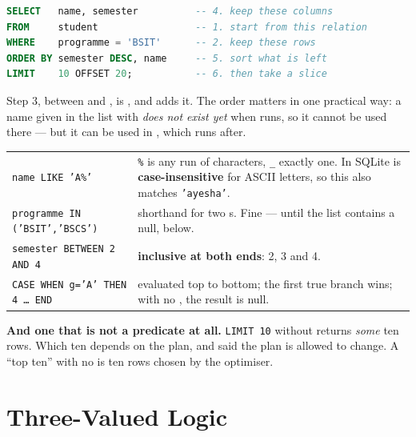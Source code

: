 \begin{definitionbox}
\begin{lstlisting}[language=sql]
SELECT   name, semester          -- 4. keep these columns
FROM     student                 -- 1. start from this relation
WHERE    programme = 'BSIT'      -- 2. keep these rows
ORDER BY semester DESC, name     -- 5. sort what is left
LIMIT    10 OFFSET 20;           -- 6. then take a slice
\end{lstlisting}

\smallskip
Step 3, between  and , is , and
 adds it. The order matters in one practical way: a name given
in the  list with  \emph{does not exist yet} when
 runs, so it cannot be used there --- but it can be used in
, which runs after.
\end{definitionbox}

\begin{examplebox}
\begin{tabular}{@{}L{4.6cm}L{9.4cm}@{}}
\texttt{name LIKE 'A\%'} & \texttt{\%} is any run of characters,
  \texttt{\_} exactly one. In SQLite  is \textbf{case-insensitive}
  for ASCII letters, so this also matches \texttt{'ayesha'}. \\
\texttt{programme IN ('BSIT','BSCS')} & shorthand for two s. Fine
  --- until the list contains a null, below. \\
\texttt{semester BETWEEN 2 AND 4} & \textbf{inclusive at both ends}: 2, 3 and
  4. \\
\texttt{CASE WHEN g='A' THEN 4 \dots\ END} & evaluated top to bottom; the
  first true branch wins; with no , the result is null. \\
\end{tabular}

\smallskip
\textbf{And one that is not a predicate at all.} \texttt{LIMIT 10} without
 returns \emph{some} ten rows. Which ten depends on the plan,
and  said the plan is allowed to change. A ``top ten'' with
no  is ten rows chosen by the optimiser.
\end{examplebox}

\section{Three-Valued Logic}

